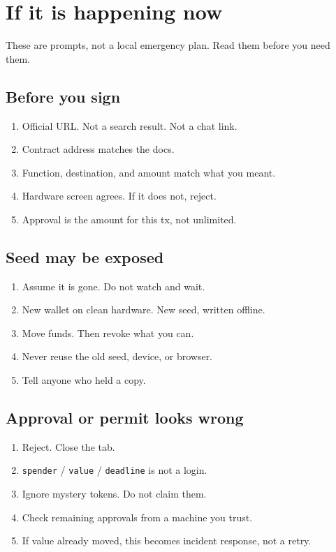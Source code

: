 \chapter{If it is happening now}

These are prompts, not a local emergency plan. Read them
before you need them.

\section{Before you sign}

\begin{enumerate}
  \item Official URL. Not a search result. Not a chat
  link.
  \item Contract address matches the docs.
  \item Function, destination, and amount match what you
  meant.
  \item Hardware screen agrees. If it does not, reject.
  \item Approval is the amount for this tx, not unlimited.
\end{enumerate}

\section{Seed may be exposed}

\begin{enumerate}
  \item Assume it is gone. Do not watch and wait.
  \item New wallet on clean hardware. New seed, written
  offline.
  \item Move funds. Then revoke what you can.
  \item Never reuse the old seed, device, or browser.
  \item Tell anyone who held a copy.
\end{enumerate}

\section{Approval or permit looks wrong}

\begin{enumerate}
  \item Reject. Close the tab.
  \item \texttt{spender} / \texttt{value} /
  \texttt{deadline} is not a login.
  \item Ignore mystery tokens. Do not claim them.
  \item Check remaining approvals from a machine you
  trust.
  \item If value already moved, this becomes incident
  response, not a retry.
\end{enumerate}

